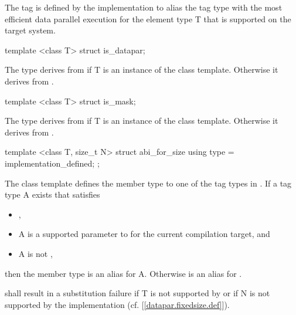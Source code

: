 \begin{itemdescr}
  \pnum
  The  tag is defined by the implementation to alias the tag type with the most efficient data parallel execution for the element type \type T that is supported on the target system.
\end{itemdescr}

\begin{itemdecl}
template <class T> struct is_datapar;
\end{itemdecl}
\begin{itemdescr}
  \pnum The  type derives from  if \type T is an instance of the \datapar class template.
  Otherwise it derives from .
\end{itemdescr}

\begin{itemdecl}
template <class T> struct is_mask;
\end{itemdecl}
\begin{itemdescr}
  \pnum The  type derives from  if \type T is an instance of the \mask class template.
  Otherwise it derives from .
\end{itemdescr}

\begin{itemdecl}
template <class T, size_t N> struct abi_for_size { using type = implementation_defined; };
\end{itemdecl}
\begin{itemdescr}
  \pnum
  The  class template defines the member type  to one of the tag types in .
  If a tag type \type A exists that satisfies
  \begin{itemize}
    \item {},
    \item \type A is a supported  parameter to \datapar[<T, Abi>] for the current compilation target, and
    \item \type A is not \fixedsizeN,
  \end{itemize} then the member type  is an alias for \type A.
  Otherwise  is an alias for \fixedsizeN.

  \pnum {} shall result in a substitution failure if \type T is not supported by \datapar or if \code N is not supported by the implementation (cf. [\ref{datapar.fixedsize.def}]).
\end{itemdescr}

